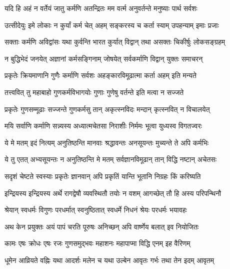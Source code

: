 \twolineshloka
{यदि हि अहं न वर्तेयं जातु कर्मणि अतन्द्रितः}
{मम वर्त्म अनुवर्तन्ते मनुष्याः पार्थ सर्वशः}%

\twolineshloka
{उत्सीदेयुः इमे लोकाः न कुर्यां कर्म चेत् अहम्}
{सङ्करस्य च कर्ता स्याम् उपहन्याम् इमाः प्रजाः}%

\twolineshloka
{सक्ताः कर्मणि अविद्वांसः यथा कुर्वन्ति भारत}
{कुर्यात् विद्वान् तथा असक्तः चिकीर्षुः लोकसङ्ग्रहम्}%

\twolineshloka
{न बुद्धिभेदं जनयेत् अज्ञानां कर्मसङ्गिनाम्}
{जोषयेत् सर्वकर्माणि विद्वान् युक्तः समाचरन्}%

\twolineshloka
{प्रकृतेः क्रियमाणानि गुणैः कर्माणि सर्वशः}
{अहङ्कारविमूढात्मा कर्ता अहम् इति मन्यते}%

\twolineshloka
{तत्त्ववित् तु महाबाहो गुणकर्मविभागयोः}
{गुणाः गुणेषु वर्तन्ते इति मत्वा न सज्जते}%

\twolineshloka
{प्रकृतेः गुणसम्मूढाः सज्जन्ते गुणकर्मसु}
{तान् अकृत्स्नविदः मन्दान् कृत्स्नवित् न विचालयेत्}%

\twolineshloka
{मयि सर्वाणि कर्माणि सन्न्यस्य अध्यात्मचेतसा}
{निराशीः निर्ममः भूत्वा युध्यस्व विगतज्वरः}%

\twolineshloka
{ये मे मतम् इदं नित्यम् अनुतिष्ठन्ति मानवाः}
{श्रद्धावन्तः अनसूयन्तः मुच्यन्ते ते अपि कर्मभिः}%

\twolineshloka
{ये तु एतत् अभ्यसूयन्तः न अनुतिष्ठन्ति मे मतम्}
{सर्वज्ञानविमूढान् तान् विद्धि नष्टान् अचेतसः}%

\twolineshloka
{सदृशं चेष्टते स्वस्याः प्रकृतेः ज्ञानवान् अपि}
{प्रकृतिं यान्ति भूतानि निग्रहः किं करिष्यति}%

\twolineshloka
{इन्द्रियस्य इन्द्रियस्य अर्थे रागद्वेषौ व्यवस्थितौ}
{तयोः न वशम् आगच्छेत् तौ हि अस्य परिपन्थिनौ}%

\twolineshloka
{श्रेयान् स्वधर्मः विगुणः परधर्मात् स्वनुष्ठितात्}
{स्वधर्मे निधनं श्रेयः परधर्मः भयावहः}%


\twolineshloka
{अथ केन प्रयुक्तः अयं पापं चरति पूरुषः}
{अनिच्छन् अपि वार्ष्णेय बलात् इव नियोजितः}%


\twolineshloka
{कामः एषः क्रोधः एषः रजः गुणसमुद्भवः}
{महाशनः महापाप्मा विद्धि एनम् इह वैरिणम्}%

\twolineshloka
{धूमेन आव्रियते वह्निः यथा आदर्शः मलेन च}
{यथा उल्बेन आवृतः गर्भः तथा तेन इदम् आवृतम्}%

